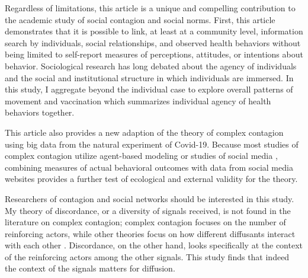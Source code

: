 Regardless of limitations, this article is a unique and compelling contribution
to the academic study of social contagion and social norms. First, this article
demonstrates that it is possible to link, at least at a community level,
information search by individuals, social relationships, and observed health
behaviors without being limited to self-report measures of perceptions,
attitudes, or intentions about behavior. Sociological research has long debated
about the agency of individuals and the social and institutional structure in
which individuals are immersed. In this study, I aggregate beyond the individual
case to explore overall patterns of movement and vaccination which summarizes
individual agency of health behaviors together.

This article also provides a new adaption of the theory of complex contagion
using big data from the natural experiment of Covid-19. Because most studies of
complex contagion utilize agent-based modeling or studies of social media \citep{aralExerciseContagionGlobal2017,sprague_house17,bond_etal12,latane_etal94}, combining measures of actual behavioral outcomes with data from
social media websites provides a further test of ecological and external
validity for the theory.

Researchers of contagion and social networks should be interested in this study.
My theory of discordance, or a diversity of signals received, is not found in
the literature on complex contagion; complex contagion focuses on the number of
reinforcing actors, while other theories focus on how different diffusants
interact with each other \citep{houghton20,goldbergSocialContagionAssociative2018,mason_etal07}. Discordance, on the other hand, looks specifically at the context of the reinforcing actors among the other signals. This study finds that indeed the context of the signals matters for diffusion.